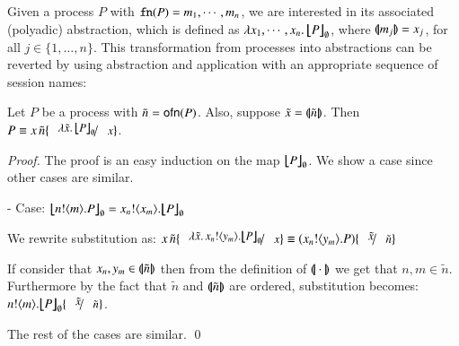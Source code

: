 

Given a process $P$ with $\mathtt{fn}(P) = m_1, \cdots, m_n$,
we are interested in its associated (polyadic) abstraction,
which is defined as $\lambda x_1, \cdots, x_n.\,\big\lfloor\!\!\big\lfloor P\big\rfloor\!\!\big\rfloor_{\emptyset}$,
where $(\!|\!|m_j|\!|\!) = x_j$, for all $j \in \{1, \ldots, n\}$.
This transformation from processes into abstractions can be reverted by
using abstraction and application with an appropriate sequence of session names:
%
\begin{proposition}\myrm
	Let $P$ be a \HOp process with $\tilde{n} = \mathsf{ofn}(P)$.
	Also, suppose $\tilde{x} = (\!|\!|\tilde{n}|\!|\!)$.
	Then $P \scong \appl{x}{\tilde{n}}\subst{\abs{\tilde{x}}\auxmap{P}{\emptyset}}{x}$.
\end{proposition}

\begin{proof}
	\noi The proof is an easy induction on the map $\big\lfloor\!\!\big\lfloor P\big\rfloor\!\!\big\rfloor_{\emptyset}$.
	We show a case since other cases are similar.

	\noi - Case: $\auxmap{\bout{n}{m} P}{\es} = \bout{x_n}{x_m} \auxmap{P}{\es}$

	\noi We rewrite substitution as:
	$\appl{x}{\tilde{n}} \subst{\abs{\tilde{x}}{\bout{x_n}{y_m} \auxmap{P}{\es}}}{x} \scong (\bout{x_n}{y_m} P) \subst{\tilde{x}}{\tilde{n}}$

	\noi If consider that $x_n, y_m \in (\!|\!|\tilde{n}|\!|\!)$ then from the definition of $(\!|\!|\cdot|\!|\!)$ we
	get that $n, m \in \tilde{n}$. Furthermore by the fact that $\tilde{n}$ and $(\!|\!|\tilde{n}|\!|\!)$ are
	ordered, substitution becomes:
	$\bout{n}{m} \auxmap{P}{\es} \subst{\tilde{x}}{\tilde{n}}$.

	\noi The rest of the cases are similar.
	\qed
\end{proof}


